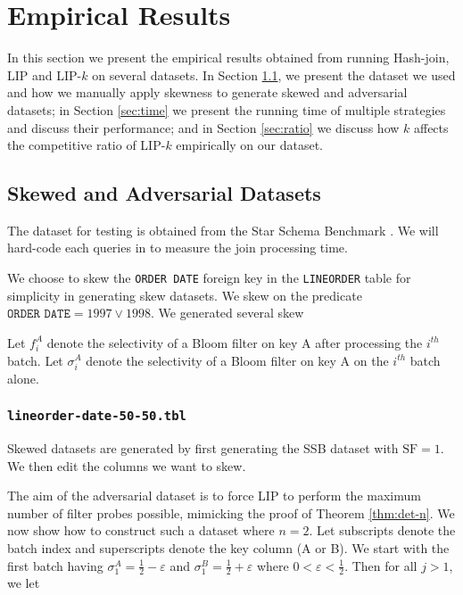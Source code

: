 \section{Empirical Results}\label{sec:experiment}

In this section we present the empirical results obtained from running Hash-join, LIP and LIP-$k$ on several datasets. In Section \ref{sec:dataset}, we present the dataset we used and how we manually apply skewness to generate skewed and adversarial datasets; in Section \ref{sec:time} we present the running time of multiple strategies and discuss their performance; and in Section \ref{sec:ratio} we discuss how $k$ affects the competitive ratio of LIP-$k$ empirically on our dataset.



\subsection{Skewed and Adversarial Datasets}
\label{sec:dataset}
The dataset for testing is obtained from the Star Schema Benchmark \cite{o2009star}. We will hard-code each queries in \cite{o2009star} to measure the join processing time.

We choose to skew the \texttt{ORDER DATE} foreign key in the \texttt{LINEORDER} table for simplicity in generating skew datasets. We skew on the predicate $\texttt{ORDER DATE} = 1997 \vee 1998$.
We generated several skew

Let $f_i^A$ denote the selectivity of a Bloom filter on key A after processing the $i^{th}$ batch. 
Let $\sigma_i^A$ denote the selectivity of a Bloom filter on key A on the $i^{th}$ batch alone. 

\subsubsection{\texttt{lineorder-date-50-50.tbl}}

Skewed datasets are generated by first generating the SSB dataset with $\text{SF} = 1$.
We then edit the columns we want to skew. 

The aim of the adversarial dataset is to force LIP to perform the maximum number of filter probes possible, mimicking the proof of Theorem \ref{thm:det-n}.
We now show how to construct such a dataset where $n = 2$.
Let subscripts denote the batch index and superscripts denote the key column (A or B).
We start with the first batch having
$\sigma_1^A = \frac{1}{2} - \varepsilon$ and $\sigma_1^B = \frac{1}{2} + \varepsilon$ where $0 < \varepsilon < \frac{1}{2}$. Then for all $j > 1$, we let

